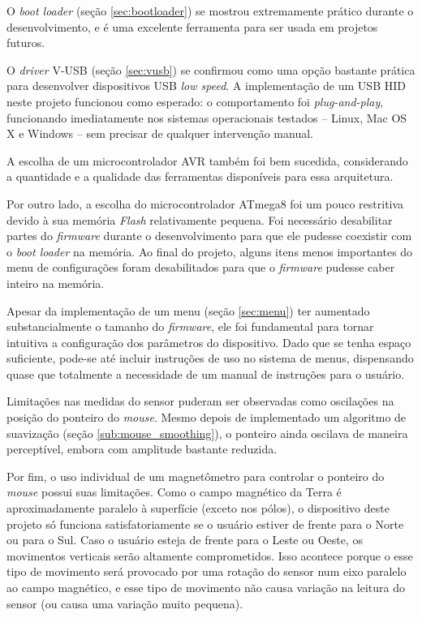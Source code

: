 \documentclass[brazil,pagestart=firstchapter]{abnt}
\begin{document}
O \textit{boot loader} (seção \ref{sec:bootloader}) se mostrou extremamente
prático durante o desenvolvimento, e é uma excelente ferramenta para ser
usada em projetos futuros.

O \textit{driver} V-USB (seção \ref{sec:vusb}) se confirmou como uma opção
bastante prática para desenvolver dispositivos \ac{USB} \textit{low speed}.
A implementação de um \ac{USB} \ac{HID} neste projeto funcionou como
esperado: o comportamento foi \textit{plug-and-play}, funcionando
imediatamente nos sistemas operacionais testados -- Linux, Mac OS X e
Windows -- sem precisar de qualquer intervenção manual.

A escolha de um microcontrolador AVR também foi bem sucedida, considerando a
quantidade e a qualidade das ferramentas disponíveis para essa arquitetura.

Por outro lado, a escolha do microcontrolador ATmega8 foi um pouco
restritiva devido à sua memória \textit{Flash} relativamente pequena. Foi
necessário desabilitar partes do \textit{firmware} durante o
desenvolvimento para que ele pudesse coexistir com o \textit{boot loader} na
memória. Ao final do projeto, alguns itens menos importantes do menu de
configurações foram desabilitados para que o \textit{firmware} pudesse caber
inteiro na memória.

Apesar da implementação de um menu (seção \ref{sec:menu}) ter aumentado
substancialmente o tamanho do \textit{firmware}, ele foi fundamental para
tornar intuitiva a configuração dos parâmetros do dispositivo. Dado que se
tenha espaço suficiente, pode-se até incluir instruções de uso no sistema de
menus, dispensando quase que totalmente a necessidade de um manual de
instruções para o usuário.



Limitações nas medidas do sensor puderam ser observadas como oscilações na
posição do ponteiro do \textit{mouse}. Mesmo depois de implementado um
algoritmo de suavização (seção \ref{sub:mouse_smoothing}), o ponteiro ainda
oscilava de maneira perceptível, embora com amplitude bastante reduzida.

Por fim, o uso individual de um magnetômetro para controlar o ponteiro do
\textit{mouse} possui suas limitações. Como o campo magnético da Terra é
aproximadamente paralelo à superfície (exceto nos pólos), o dispositivo
deste projeto só funciona satisfatoriamente se o usuário estiver de frente
para o Norte ou para o Sul. Caso o usuário esteja de frente para o Leste ou
Oeste, os movimentos verticais serão altamente comprometidos. Isso acontece
porque o esse tipo de movimento será provocado por uma rotação do sensor num
eixo paralelo ao campo magnético, e esse tipo de movimento não causa
variação na leitura do sensor (ou causa uma variação muito pequena).
\end{document}
